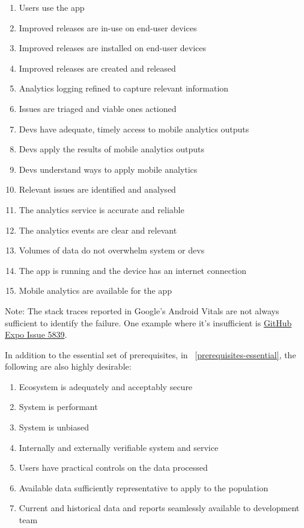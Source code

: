 {\small
\begin{enumerate}
    \itemsep0em
    \item Users use the app
    \item Improved releases are in-use on end-user devices
    \item Improved releases are installed on end-user devices
    \item Improved releases are created and released
    \item Analytics logging refined to capture relevant information
    \item Issues are triaged and viable ones actioned
    \item Devs have adequate, timely access to mobile analytics outputs
    \item Devs apply the results of mobile analytics outputs
    \item Devs understand ways to apply mobile analytics
    \item Relevant issues are identified and analysed
    \item The analytics service is accurate and reliable
    \item The analytics events are clear and relevant
    \item Volumes of data do not overwhelm system or devs
    \item The app is running and the device has an internet connection
    \item Mobile analytics are available for the app
    \label{prerequisites-essential}
\end{enumerate}
}
Note: The stack traces reported in Google's Android Vitals are not always sufficient to identify the failure. One example where it's insufficient is \href{insight-expo-stack-trace-not-sufficient-to-identify-the-failure}{GitHub Expo Issue 5839}.

In addition to the essential set of prerequisites, in ~\ref{prerequisites-essential}, the following are also highly desirable:
{\small
\begin{enumerate} %
    \itemsep0em
    \item Ecosystem is adequately and acceptably secure
    \item System is performant
    \item System is unbiased
    \item Internally and externally verifiable system and service
    \item Users have practical controls on the data processed
    \item Available data sufficiently representative to apply to the population
    \item Current and historical data and reports seamlessly available to development team
    \label{prerequisites-desirable}
\end{enumerate}
}



